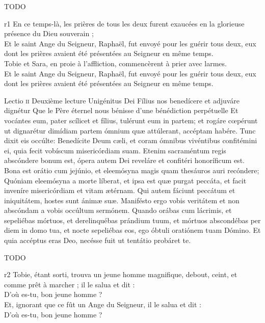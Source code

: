 \documentclass[twoside]{article}
\begin{document}
\begin{paracol}[1]{2}
{		TODO
	
	}
	{r1}
	{\rr En ce temps-là, les prières de tous les deux furent exaucées en la glorieuse présence du Dieu souverain ; \\
	\GreSpecial{*} Et le saint Ange du Seigneur, Raphaël, fut envoyé pour les guérir tous deux, eux dont les prières avaient été présentées au Seigneur en même temps. \\
	\vv Tobie et Sara, en proie à l’affliction, commencèrent à prier avec larmes.\\
	\GreSpecial{*} Et le saint Ange du Seigneur, Raphaël, fut envoyé pour les guérir tous deux, eux dont les prières avaient été présentées au Seigneur en même temps.}

\lectioresponsorium
	{Lectio \textsc{ii}}
	{Deuxième lecture}
	{Unigénitus Dei Fílius nos benedícere et adjuváre dignétur}
	{Que le Père éternel nous bénisse d'une bénédiction perpétuelle}
	{
		Et vocántes eum, pater scílicet et fílius, tulérunt eum in partem; et rogáre cœpérunt ut dignarétur dimídiam partem ómnium quæ attúlerant, accéptam habére.
		Tunc dixit eis occúlte: Benedícite Deum cæli, et coram ómnibus vivéntibus confitémini ei, quia fecit vobíscum misericórdiam suam.
		Etenim sacraméntum regis abscóndere bonum est, ópera autem Dei reveláre et confitéri honoríficum est.
		Bona est orátio cum jejúnio, et eleemósyna magis quam thesáuros auri recóndere;
		Quóniam eleemósyna a morte líberat, et ipsa est quæ purgat peccáta, et facit inveníre misericórdiam et vitam ætérnam.
		Qui autem fáciunt peccátum et iniquitátem, hostes sunt ánimæ suæ.
		Manifésto ergo vobis veritátem et non abscóndam a vobis occúltum sermónem.
		Quando orábas cum lácrimis, et sepeliébas mórtuos, et derelinquébas prándium tuum, et mórtuos abscondébas per diem in domo tua, et nocte sepeliébas eos, ego óbtuli oratiónem tuam Dómino.
		Et quia accéptus eras Deo, necésse fuit ut tentátio probáret te.
	}
	{	 TODO
	
	}
	{r2}
	{\rr Tobie, étant sorti, trouva un jeune homme magnifique, debout, ceint, et comme prêt à marcher ; il le salua et dit :\\
	\GreSpecial{*} D’où es-tu, bon jeune homme ?\\
	\vv Et, ignorant que ce fût un Ange du Seigneur, il le salua et dit :\\
	\GreSpecial{*} D’où es-tu, bon jeune homme ?}


\end{paracol}
\end{document}
